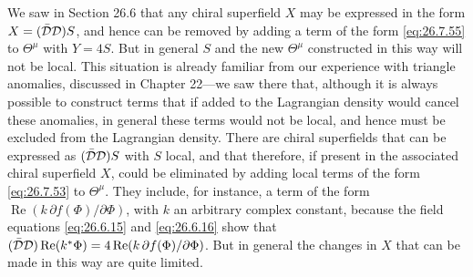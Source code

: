 We saw in Section 26.6 that any chiral superfield \(X\) may be expressed in
the form \(X=(\bar{\mathcal{D}}\mathcal{D})S\), and hence can be removed by adding a
term of the form \eqref{eq:26.7.55} to \(\Theta^\mu\) with \(Y=4S\). But in
general \(S\) and the new \(\Theta^\mu\) constructed in this way will not be
local. This situation is already familiar from our experience with triangle
anomalies, discussed in Chapter 22---we saw there that, although it is always
possible to construct terms that if added to the Lagrangian density would
cancel these anomalies, in general these terms would not be local, and hence
must be excluded from the Lagrangian density. There are chiral superfields
that can be expressed as \((\bar{\mathcal{D}}\mathcal{D})S\) with \(S\) local, and
that therefore, if present in the associated chiral superfield \(X\), could
be eliminated by adding local terms of the form \eqref{eq:26.7.53} to
\(\Theta^\mu\). They include, for instance, a term of the form
\(\operatorname{Re}(k\,\partial f(\Phi)/\partial\Phi)\), with \(k\) an
arbitrary complex constant, because the field equations \eqref{eq:26.6.15}
and \eqref{eq:26.6.16} show that
\((\bar{\mathcal{D}}\mathcal{D})\operatorname{Re}(k^*\Phi)
=4\operatorname{Re}(k\,\partial f(\Phi)/\partial\Phi)\). But in general the
changes in \(X\) that can be made in this way are quite limited.

